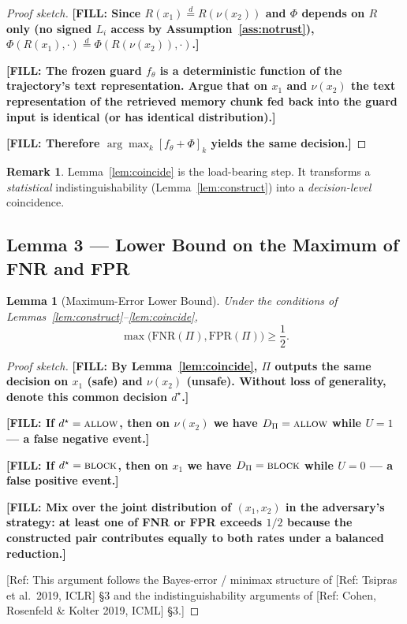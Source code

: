 \documentclass[11pt]{article}
\newcommand{\TODO}[1]{{\color{red}\textbf{[FILL: #1]}}}
\newcommand{\REF}[1]{{\color{teal}\textsf{[Ref: #1]}}}
\theoremstyle{plain}
\newtheorem{lemma}{Lemma}
\theoremstyle{definition}
\newtheorem{remark}{Remark}
\begin{document}
\begin{proof}[Proof sketch]
\TODO{Since $R(x_1) \overset{d}{=} R(\nu(x_2))$ and $\Phi$ depends on $R$ only
(no signed $L_i$ access by Assumption~\ref{ass:notrust}),
$\Phi(R(x_1), \cdot) \overset{d}{=} \Phi(R(\nu(x_2)), \cdot)$.}

\TODO{The frozen guard $f_\theta$ is a deterministic function of the
trajectory's text representation. Argue that on $x_1$ and $\nu(x_2)$
the text representation of the retrieved memory chunk fed back into
the guard input is identical (or has identical distribution).}

\TODO{Therefore $\arg\max_k [f_\theta + \Phi]_k$ yields the same decision.}
\end{proof}

\begin{remark}
Lemma~\ref{lem:coincide} is the load-bearing step. It transforms a
\emph{statistical} indistinguishability (Lemma~\ref{lem:construct})
into a \emph{decision-level} coincidence.
\end{remark}

\subsection{Lemma 3 --- Lower Bound on the Maximum of FNR and FPR}

\begin{lemma}[Maximum-Error Lower Bound]\label{lem:lowerbound}
Under the conditions of Lemmas~\ref{lem:construct}--\ref{lem:coincide},
\[
  \max\bigl(\mathrm{FNR}(\Pi), \mathrm{FPR}(\Pi)\bigr) \ge \frac{1}{2}.
\]
\end{lemma}

\begin{proof}[Proof sketch]
\TODO{By Lemma~\ref{lem:coincide}, $\Pi$ outputs the same decision on
$x_1$ (safe) and $\nu(x_2)$ (unsafe). Without loss of generality,
denote this common decision $d^\star$.}

\TODO{If $d^\star = \textsc{allow}$, then on $\nu(x_2)$ we have
$D_\Pi = \textsc{allow}$ while $U = 1$ --- a false negative event.}

\TODO{If $d^\star = \textsc{block}$, then on $x_1$ we have
$D_\Pi = \textsc{block}$ while $U = 0$ --- a false positive event.}

\TODO{Mix over the joint distribution of $(x_1, x_2)$ in the
adversary's strategy: at least one of FNR or FPR exceeds $1/2$
because the constructed pair contributes equally to both rates
under a balanced reduction.}

\REF{This argument follows the Bayes-error / minimax structure of
\REF{Tsipras et al.\ 2019, ICLR} \S 3 and the indistinguishability
arguments of \REF{Cohen, Rosenfeld \& Kolter 2019, ICML} \S 3.}
\end{proof}
\end{document}
